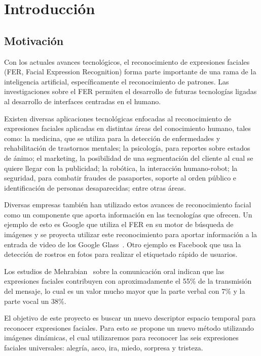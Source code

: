 \chapter[Introducción]{Introducción}
\label{ch:intro}

\section{Motivación}
\label{sec:motivacion}
Con los actuales avances tecnológicos, el reconocimiento de expresiones faciales (FER, Facial Expression Recognition) forma parte importante de una rama de la inteligencia artificial, específicamente el reconocimiento de patrones.  Las investigaciones sobre el FER permiten el desarrollo de futuras tecnologías ligadas al desarrollo de interfaces centradas en el humano. 

Existen diversas aplicaciones tecnológicas enfocadas al reconocimiento de expresiones faciales aplicadas en distintas áreas del conocimiento humano, tales como:  la medicina, que se utiliza para la detección de enfermedades y rehabilitación de trastornos mentales; la psicología, para reportes sobre estados de ánimo; el marketing, la posibilidad de una segmentación del cliente al cual se quiere llegar con la publicidad; la robótica, la interacción humano-robot; la seguridad, para combatir fraudes de pasaportes, soporte al orden público e identificación de personas desaparecidas; entre otras áreas.

Diversas empresas también han utilizado estos avances de reconocimiento facial como un componente que aporta información en las tecnologías que ofrecen. Un ejemplo de esto es  Google que utiliza el FER en su motor de búsqueda de imágenes y se proyecta utilizar este reconocimiento para aportar información a la entrada de video de los Google Glass~\cite{GoogleGlass}. Otro ejemplo es Facebook que usa la detección de rostros en  fotos para realizar el etiquetado rápido de usuarios.

Los estudios de Mehrabian~\cite{Mehrabian1968} sobre la comunicación oral indican que las expresiones faciales contribuyen con aproximadamente el 55\% de la transmisión del mensaje, lo cual es un valor mucho mayor que la parte verbal con 7\% y la parte vocal un 38\%.

El objetivo de este proyecto es buscar un nuevo descriptor espacio temporal para reconocer expresiones faciales. Para esto se propone un nuevo método utilizando imágenes dinámicas, el cual utilizaremos para reconocer las seis expresiones faciales universales: alegría, asco, ira, miedo, sorpresa y tristeza.

